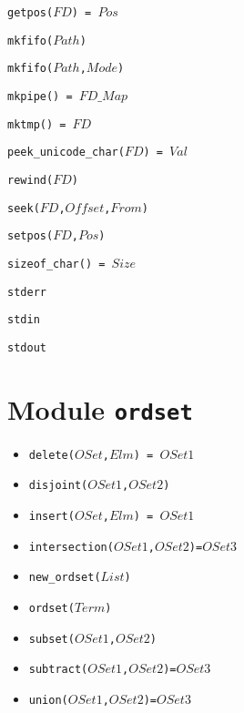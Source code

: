 \documentclass[10pt]{article}
\begin{document}
\begin{multicols}{2}
\begin{scriptsize}
\begin{itemize}
{%
   \item \texttt{getpos($FD$) = $Pos$}
   \item \texttt{mkfifo($Path$)}
   \item \texttt{mkfifo($Path$,$Mode$)}
   \item \texttt{mkpipe() = $FD\_Map$}
   \item \texttt{mktmp() = $FD$}
   \item \texttt{peek\_unicode\_char($FD$) = $Val$}
   \item \texttt{rewind($FD$)}
   \item \texttt{seek($FD$,$Offset$,$From$)}
   \item \texttt{setpos($FD$,$Pos$)}
   \item \texttt{sizeof\_char() = $Size$}
   \item \texttt{stderr}
   \item \texttt{stdin}
   \item \texttt{stdout}
}
\end{itemize}
\end{scriptsize}

\section*{Module \texttt{ordset}}
\begin{scriptsize}
\begin{itemize}
\item \texttt{delete($OSet$,$Elm$) = $OSet1$}
\item \texttt{disjoint($OSet1$,$OSet2$)}
\item \texttt{insert($OSet$,$Elm$) = $OSet1$}
\item \texttt{intersection($OSet1$,$OSet2$)=$OSet3$}
\item \texttt{new\_ordset($List$)}
\item \texttt{ordset($Term$)}
\item \texttt{subset($OSet1$,$OSet2$)}
\item \texttt{subtract($OSet1$,$OSet2$)=$OSet3$}
\item \texttt{union($OSet1$,$OSet2$)=$OSet3$}
\end{itemize}
\end{scriptsize}


\end{multicols}
\end{document}
